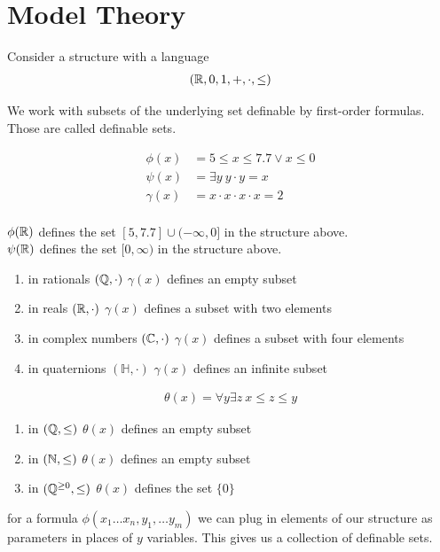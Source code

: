 \documentclass{amsart}
\begin{document}
\section{Model Theory}

Consider a structure with a language
\begin{align*}
	(\mathbb{R}, 0, 1, +, \cdot, \leq)
\end{align*}

We work with subsets of the underlying set definable by first-order formulas.
Those are called definable sets.

\begin{align*}
	\phi(x) &= 5 \leq x \leq 7.7 \vee x \leq 0\\
	\psi(x) &= \exists y \ y \cdot y = x \\
	\gamma(x) &= x \cdot x \cdot x \cdot x = 2 \\
\end{align*}

$\phi(\mathbb{R})$ defines the set $[5, 7.7] \cup (-\infty, 0]$ in the structure above. \\
$\psi(\mathbb{R})$ defines the set $[0, \infty)$ in the structure above.

\begin{enumerate}
	\item in rationals $(\mathbb{Q}, \cdot)$ $\gamma(x)$ defines an empty subset
	\item in reals $(\mathbb{R}, \cdot)$ $\gamma(x)$ defines a subset with two elements
	\item in complex numbers $(\mathbb{C}, \cdot)$ $\gamma(x)$ defines a subset with four elements
	\item in quaternions $(\mathbb H, \cdot)$ $\gamma(x)$ defines an infinite subset
\end{enumerate}

\begin{align*}
	\theta(x) = \forall y \exists z \ x \leq z \leq y
\end{align*}

\begin{enumerate}
	\item in $(\mathbb{Q}, \leq)$ $\theta(x)$ defines an empty subset
	\item in $(\mathbb{N}, \leq)$ $\theta(x)$ defines an empty subset
	\item in $(\mathbb{Q}^{\geq 0}, \leq)$ $\theta(x)$ defines the set $\{0\}$
\end{enumerate}

\begin{Definition}
	for a formula $\phi(x_1 \ldots x_n, y_1, \ldots y_m)$ we can plug in elements of our structure as parameters in places of $y$ variables. This gives us a collection of definable sets. 
\end{Definition}
\end{document}
